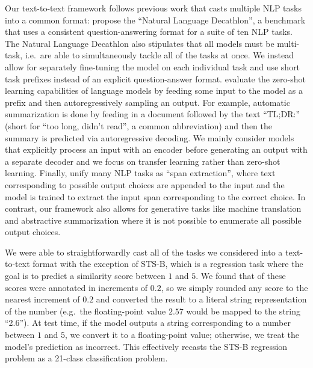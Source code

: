 \documentclass[twoside,11pt]{article}
\begin{document}
Our text-to-text framework follows previous work that casts multiple NLP tasks into a common format:
\citet{mccann2018natural} propose the ``Natural Language Decathlon'', a benchmark that uses a consistent question-answering format for a suite of ten NLP tasks.
The Natural Language Decathlon also stipulates that all models must be multi-task, i.e.\ are able to simultaneously tackle all of the tasks at once.
We instead allow for separately fine-tuning the model on each individual task and use short task prefixes instead of an explicit question-answer format.
\citet{radford2019language} evaluate the zero-shot learning capabilities of language models by feeding some input to the model as a prefix and then autoregressively sampling an output.
For example, automatic summarization is done by feeding in a document followed by the text ``TL;DR:'' (short for ``too long, didn't read'', a common abbreviation) and then the summary is predicted via autoregressive decoding.
We mainly consider models that explicitly process an input with an encoder before generating an output with a separate decoder and we focus on transfer learning rather than zero-shot learning.
Finally, \citet{keskar2019unifying} unify many NLP tasks as ``span extraction'', where text corresponding to possible output choices are appended to the input and the model is trained to extract the input span corresponding to the correct choice.
In contrast, our framework also allows for generative tasks like machine translation and abstractive summarization where it is not possible to enumerate all possible output choices.

We were able to straightforwardly cast all of the tasks we considered into a text-to-text format with the exception of STS-B, which is a regression task where the goal is to predict a similarity score between $1$ and $5$.
We found that  of these scores were annotated in increments of $0.2$, so we simply rounded any score to the nearest increment of $0.2$ and converted the result to a literal string representation of the number (e.g.\ the floating-point value $2.57$ would be mapped to the string ``2.6'').
At test time, if the model outputs a string corresponding to a number between $1$ and $5$, we convert it to a floating-point value; otherwise, we treat the model's prediction as incorrect.
This effectively recasts the STS-B regression problem as a 21-class classification problem.
\end{document}
